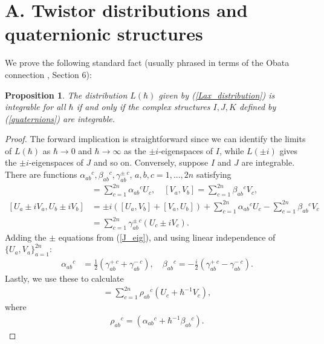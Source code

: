 \documentclass[a4paper,12pt,reqno]{amsart}
\newcounter{counter2}
\numberwithin{equation}{section}
\numberwithin{counter2}{section}
\newcounter{counter3}
\newtheorem{prop}[counter2]{Proposition}
\begin{document}
\makeatletter
\def\@seccntformat#1{%
  \expandafter\ifx\csname c@#1\endcsname\c@section\else
  \csname the#1\endcsname\quad
  \fi}
\makeatother

\appendix
\section{A.  Twistor distributions and quaternionic structures}\label{q_integrability}
We prove the following standard fact (usually phrased in terms of the Obata connection \cite{S},  Section 6):
\begin{prop}
The distribution $L(\hbar)$ given by \textup{(\ref{Lax_distribution})} is integrable for all $\hbar$ if and only if the complex structures $I,J,K$ defined by \textup{(\ref{quaternions})} are integrable.  
\end{prop}
\begin{proof}
The forward implication is straightforward since we can identify the limits of $L(\hbar)$ as $\hbar \to 0$ and $\hbar \to \infty$ as the $\pm i$-eigenspaces of $I$,  while $L(\pm i)$ gives the $\pm i$-eigenspaces of $J$ and so on.  Conversely,  suppose $I$ and $J$ are integrable.  There are functions $\alpha_{ab}{}^{c},  \beta_{ab}{}^{c},  \gamma^\pm_{ab}{}^{c}$,  $a,b,c = 1,...,2n$ satisfying 
\begin{align}
[U_{a},U_{b}] &= \sum_{c=1}^{2n}\alpha_{ab}{}^{c}U_{c},  \quad 
[V_{a},V_{b}] = \sum_{c=1}^{2n}\beta_{ab}{}^{c}V_{c},\\ 
[U_{a} \pm iV_{a},  U_{b} \pm iV_{b}] 
&= \pm i([U_{a},V_{b}] + [V_{a},U_{b}])  + \sum_{c=1}^{2n}\alpha_{ab}{}^{c}U_{c} - \sum_{c=1}^{2n}\beta_{ab}{}^{c}V_{c} \nonumber \\
&= \sum_{c=1}^{2n} \gamma_{ab}^{\pm}{}^{c}(U_{c}\pm i V_{c}).  \label{J_eig}
\end{align}
Adding the $\pm$ equations from (\ref{J_eig}),  and using linear independence of $\{U_{a},V_{a}\}_{a=1}^{2n}$:
\begin{align}
\alpha_{ab}{}^{c} &= \frac{1}{2}(\gamma_{ab}^{+}{}^{c} +\gamma_{ab}^{-}{}^{c}),   \quad
\beta_{ab}{}^{c} = -\frac{i}{2}(\gamma_{ab}^{+}{}^{c} - \gamma_{ab}^{-}{}^{c}). 
\end{align}
Lastly,  we use these to calculate
\begin{align}
[U_{a} + \hbar^{-1}V_{a},  U_{b} + \hbar^{-1}V_{b}]  = \sum_{c=1}^{2n} \rho_{ab}{}^{c}(U_{c} + \hbar^{-1}V_{c}),  
\end{align}
where
\begin{align}
\rho_{ab}{}^{c} = (\alpha_{ab}{}^{c} + \hbar^{-1}\beta_{ab}{}^{c}).  
\end{align}
\end{proof}
\end{document}
